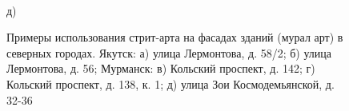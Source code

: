 \begin{figure}[h]
\begin{center}
\begin{minipage}[h]{0.3\linewidth}
        \end{minipage}
        \hfill
        \begin{minipage}[h]{0.3\linewidth}
         \\ д)
        \end{minipage}
    \end{center}
    \caption{Примеры использования стрит-арта на фасадах зданий (мурал арт) в северных городах.
                Якутск: а) улица Лермонтова, д. 58/2; б) улица Лермонтова, д. 56;
                Мурманск: в) Кольский проспект, д. 142; г) Кольский проспект, д. 138, к. 1; д) улица Зои Космодемьянской, д. 32-36
                }
    \label{fig:st1coloristic_murals}
    \end{figure}